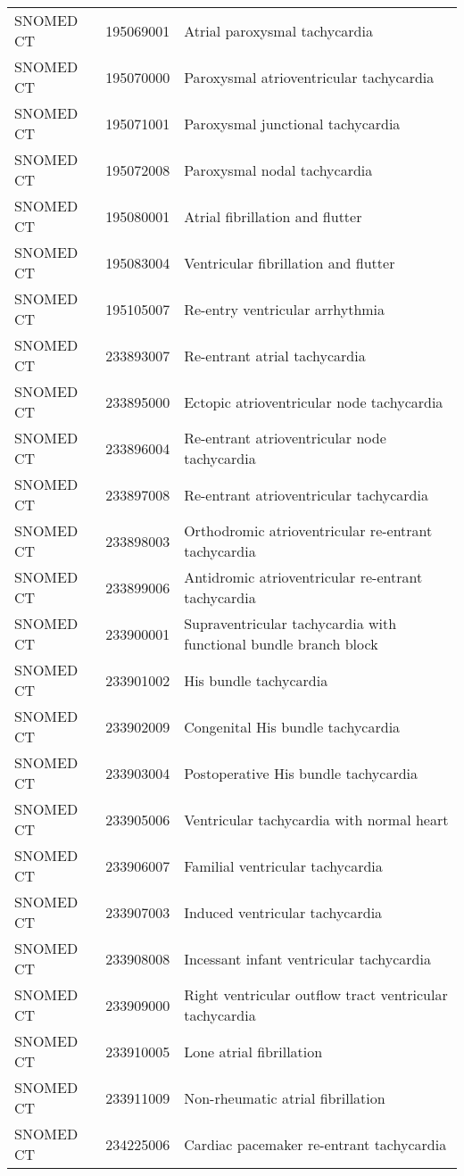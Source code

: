 \begin{longtable}{p{}p{}p{}}
  SNOMED CT & 195069001 & Atrial paroxysmal tachycardia \\ 
  SNOMED CT & 195070000 & Paroxysmal atrioventricular tachycardia \\ 
  SNOMED CT & 195071001 & Paroxysmal junctional tachycardia \\ 
  SNOMED CT & 195072008 & Paroxysmal nodal tachycardia \\ 
  SNOMED CT & 195080001 & Atrial fibrillation and flutter \\ 
  SNOMED CT & 195083004 & Ventricular fibrillation and flutter \\ 
  SNOMED CT & 195105007 & Re-entry ventricular arrhythmia \\ 
  SNOMED CT & 233893007 & Re-entrant atrial tachycardia \\ 
  SNOMED CT & 233895000 & Ectopic atrioventricular node tachycardia \\ 
  SNOMED CT & 233896004 & Re-entrant atrioventricular node tachycardia \\ 
  SNOMED CT & 233897008 & Re-entrant atrioventricular tachycardia \\ 
  SNOMED CT & 233898003 & Orthodromic atrioventricular re-entrant tachycardia \\ 
  SNOMED CT & 233899006 & Antidromic atrioventricular re-entrant tachycardia \\ 
  SNOMED CT & 233900001 & Supraventricular tachycardia with functional bundle branch block \\ 
  SNOMED CT & 233901002 & His bundle tachycardia \\ 
  SNOMED CT & 233902009 & Congenital His bundle tachycardia \\ 
  SNOMED CT & 233903004 & Postoperative His bundle tachycardia \\ 
  SNOMED CT & 233905006 & Ventricular tachycardia with normal heart \\ 
  SNOMED CT & 233906007 & Familial ventricular tachycardia \\ 
  SNOMED CT & 233907003 & Induced ventricular tachycardia \\ 
  SNOMED CT & 233908008 & Incessant infant ventricular tachycardia \\ 
  SNOMED CT & 233909000 & Right ventricular outflow tract ventricular tachycardia \\ 
  SNOMED CT & 233910005 & Lone atrial fibrillation \\ 
  SNOMED CT & 233911009 & Non-rheumatic atrial fibrillation \\ 
  SNOMED CT & 234225006 & Cardiac pacemaker re-entrant tachycardia \\ 

\end{longtable}

